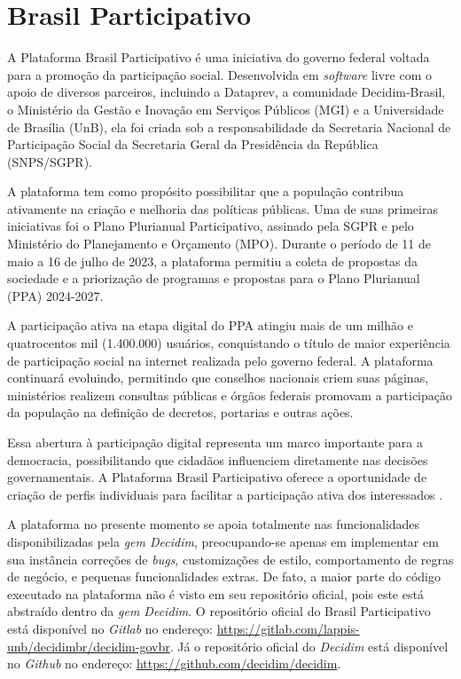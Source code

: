 \section {Brasil Participativo}

A Plataforma Brasil Participativo é uma iniciativa do governo federal voltada para a promoção da participação social.
Desenvolvida em \textit{software} livre com o apoio de diversos parceiros, incluindo a Dataprev, a comunidade Decidim-Brasil, o Ministério da Gestão e Inovação em Serviços Públicos (MGI) e a Universidade de Brasília (UnB), ela foi criada sob a responsabilidade da Secretaria Nacional de Participação Social da Secretaria Geral da Presidência da República (SNPS/SGPR).

A plataforma tem como propósito possibilitar que a população contribua ativamente na criação e melhoria das políticas públicas.
Uma de suas primeiras iniciativas foi o Plano Plurianual Participativo, assinado pela SGPR e pelo Ministério do Planejamento e Orçamento (MPO).
Durante o período de 11 de maio a 16 de julho de 2023, a plataforma permitiu a coleta de propostas da sociedade e a priorização de programas e propostas para o Plano Plurianual (PPA) 2024-2027.

A participação ativa na etapa digital do PPA atingiu mais de um milhão e quatrocentos mil (1.400.000) usuários, conquistando o título de maior experiência de participação social na internet realizada pelo governo federal.
A plataforma continuará evoluindo, permitindo que conselhos nacionais criem suas páginas, ministérios realizem consultas públicas e órgãos federais promovam a participação da população na definição de decretos, portarias e outras ações.

Essa abertura à participação digital representa um marco importante para a democracia, possibilitando que cidadãos influenciem diretamente nas decisões governamentais.
A Plataforma Brasil Participativo oferece a oportunidade de criação de perfis individuais para facilitar a participação ativa dos interessados \cite{brasilparticipativo-sobre}.

A plataforma no presente momento se apoia totalmente nas funcionalidades disponibilizadas pela \textit{gem Decidim}, preocupando-se apenas em implementar em sua instância correções de \textit{bugs}, customizações de estilo, comportamento de regras de negócio, e pequenas funcionalidades extras.
De fato, a maior parte do código executado na plataforma não é visto em seu repositório oficial, pois este está abstraído dentro da \textit{gem Decidim}.
O repositório oficial do Brasil Participativo está disponível no \textit{Gitlab} no endereço: \href{https://gitlab.com/lappis-unb/decidimbr/decidim-govbr}{https://gitlab.com/lappis-unb/decidimbr/decidim-govbr}.
Já o repositório oficial do \textit{Decidim} está disponível no \textit{Github} no endereço: \href{https://github.com/decidim/decidim}{https://github.com/decidim/decidim}.